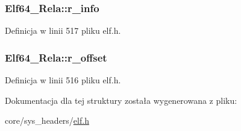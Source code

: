 \hypertarget{struct_elf64___rela_aeab8bc0f9035184127ec02d947bf2c76}{
\subsubsection[{r\-\_\-info}]{ Elf64\-\_\-\-Rela\-::r\-\_\-info}}\label{struct_elf64___rela_aeab8bc0f9035184127ec02d947bf2c76}


Definicja w linii 517 pliku elf.\-h.

\hypertarget{struct_elf64___rela_a9ea7e07ec6e0d57bf4bcd53b89de7948}{
\subsubsection[{r\-\_\-offset}]{ Elf64\-\_\-\-Rela\-::r\-\_\-offset}}\label{struct_elf64___rela_a9ea7e07ec6e0d57bf4bcd53b89de7948}


Definicja w linii 516 pliku elf.\-h.



Dokumentacja dla tej struktury została wygenerowana z pliku\-:\begin{DoxyCompactItemize}
\item 
core/sys\-\_\-headers/\hyperlink{elf_8h}{elf.\-h}\end{DoxyCompactItemize}

